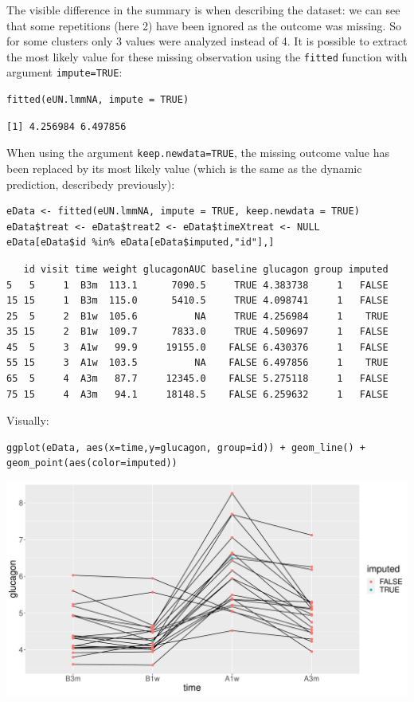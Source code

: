 \documentclass[12pt]{article}
\begin{document}
The visible difference in the summary is when describing the dataset:
we can see that some repetitions (here 2) have been ignored as the
outcome was missing. So for some clusters only 3 values were analyzed
instead of 4. It is possible to extract the most likely value for
these missing observation using the \texttt{fitted} function with argument
\texttt{impute=TRUE}:
\lstset{language=r,label= ,caption= ,captionpos=b,numbers=none}
\begin{lstlisting}
fitted(eUN.lmmNA, impute = TRUE)
\end{lstlisting}

\begin{verbatim}
[1] 4.256984 6.497856
\end{verbatim}


When using the argument \texttt{keep.newdata=TRUE}, the missing outcome value
has been replaced by its most likely value (which is the same as the
dynamic prediction, describedy previously):
\lstset{language=r,label= ,caption= ,captionpos=b,numbers=none}
\begin{lstlisting}
eData <- fitted(eUN.lmmNA, impute = TRUE, keep.newdata = TRUE)
eData$treat <- eData$treat2 <- eData$timeXtreat <- NULL
eData[eData$id %in% eData[eData$imputed,"id"],]
\end{lstlisting}

\begin{verbatim}
   id visit time weight glucagonAUC baseline glucagon group imputed
5   5     1  B3m  113.1      7090.5     TRUE 4.383738     1   FALSE
15 15     1  B3m  115.0      5410.5     TRUE 4.098741     1   FALSE
25  5     2  B1w  105.6          NA     TRUE 4.256984     1    TRUE
35 15     2  B1w  109.7      7833.0     TRUE 4.509697     1   FALSE
45  5     3  A1w   99.9     19155.0    FALSE 6.430376     1   FALSE
55 15     3  A1w  103.5          NA    FALSE 6.497856     1    TRUE
65  5     4  A3m   87.7     12345.0    FALSE 5.275118     1   FALSE
75 15     4  A3m   94.1     18148.5    FALSE 6.259632     1   FALSE
\end{verbatim}


Visually:
\lstset{language=r,label= ,caption= ,captionpos=b,numbers=none}
\begin{lstlisting}
ggplot(eData, aes(x=time,y=glucagon, group=id)) + geom_line() + geom_point(aes(color=imputed))
\end{lstlisting}

\begin{center}
\includegraphics[trim={0 0 0 0},width=1\textwidth]{./figures/imputation.pdf}
\end{center}
\end{document}
